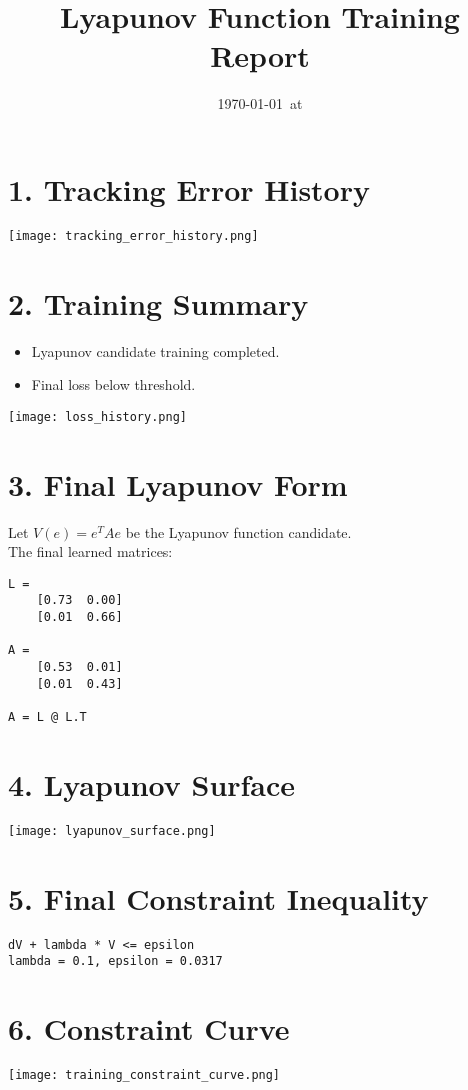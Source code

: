 \documentclass[11pt]{article}
\title{Lyapunov Function Training Report}
\author{}
\date{\today\ at \currenttime}
\begin{document}
\maketitle

\section*{1. Tracking Error History}
\texttt{[image: tracking\_error\_history.png]}

\section*{2. Training Summary}
\begin{itemize}
  \item Lyapunov candidate training completed.
  \item Final loss below threshold.
\end{itemize}
\texttt{[image: loss\_history.png]}

\section*{3. Final Lyapunov Form}
Let $V(e) = e^T A e$ be the Lyapunov function candidate. \\
The final learned matrices:
\begin{verbatim}
L = 
    [0.73  0.00]
    [0.01  0.66]

A = 
    [0.53  0.01]
    [0.01  0.43]

A = L @ L.T
\end{verbatim}

\section*{4. Lyapunov Surface}
\texttt{[image: lyapunov\_surface.png]}

\section*{5. Final Constraint Inequality}
\begin{verbatim}
dV + lambda * V <= epsilon
lambda = 0.1, epsilon = 0.0317\end{verbatim}

\section*{6. Constraint Curve}
\texttt{[image: training\_constraint\_curve.png]}
\end{document}
